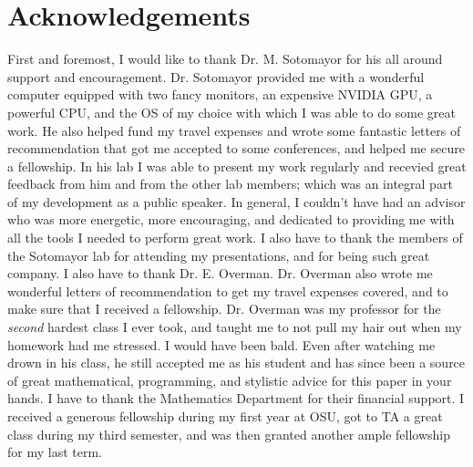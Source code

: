 \newpage
\section*{Acknowledgements}
        First and foremost, I would like to thank Dr. M. Sotomayor for his all around support and encouragement. Dr. Sotomayor provided me with a wonderful computer equipped with two fancy monitors, an expensive NVIDIA GPU, a powerful CPU, and the OS of my choice with which I was able to do some great work. He also helped fund my travel expenses and wrote some fantastic letters of recommendation that got me accepted to some conferences, and helped me secure a fellowship. In his lab I was able to present my work regularly and recevied great feedback from him and from the other lab members; which was an integral part of my development as a public speaker. In general, I couldn't have had an advisor who was more energetic, more encouraging, and dedicated to providing me with all the tools I  needed to perform great work.
        I also have to thank the members of the Sotomayor lab for attending my presentations, and for being such great company.
        I also have to thank Dr. E. Overman. Dr. Overman also wrote me wonderful letters of recommendation to get my travel expenses covered, and to make sure that I received a fellowship. Dr. Overman was my professor for the \emph{second} hardest class I ever took, and taught me to not pull my hair out when my homework had me stressed. I would have been bald. Even after watching me drown in his class, he still accepted me as his student and has since been a source of great mathematical, programming, and stylistic advice for this paper in your hands.
        I have to thank the Mathematics Department for their financial support. I received a generous fellowship during my first year at OSU, got to TA a great class during my third semester, and was then granted another ample fellowship for my last term. 

        

